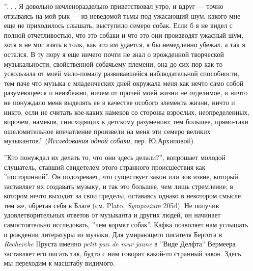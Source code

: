 \documentclass[12pt]{book}
\begin{document}
\smallskip
{}\relax
{}\relax

''. . . Я довольно нечленораздельно приветствовал утро, и вдруг --- точно отзываясь на мой рык --- из неведомой тьмы под ужасающий шум, какого мне еще не приходилось слышать, выступило семеро собак. Если б я не видел с полной отчетливостью, что это собаки и что это они производят ужасный шум, хотя я не мог взять в толк, как это им удается, я бы немедленно убежал, а так я остался. В ту пору я еще ничего почти не знал о врожденной творческой музыкальности, свойственной собачьему племени, она до сих пор как-то ускользала от моей мало-помалу развивавшейся наблюдательной способности, тем паче что музыка с младенческих дней окружала меня как нечто само собой разумеющееся и неизбежно, ничем от прочей моей жизни не отделимое, и ничто не понуждало меня выделять ее в качестве особого элемента жизни, ничто и никто, если не считать кое-каких намеков со стороны взрослых, неопределенных, впрочем, намеков, снисходящих к детскому разумению; тем большее, прямо-таки ошеломительное впечатление произвели на меня эти семеро великих музыкантов.'' (\textit{Исследования одной собаки}, пер. Ю.Архиповой)

\relax
{}\relax
\smallskip

''Кто понуждал их делать то, что они здесь делали?'', вопрошает молодой слушатель, ставший свидетелем этого странного происшествия как ''посторонний''. Он подозревает, что существует закон или зов извне, который заставляет их создавать музыку, и так это большее, чем лишь стремление, в котором нечто выходит за свои пределы, оставаясь однако в некотором смысле тем же, обретая себя в Благе (см. Plato, \textit{Symposium} 205d). Не получив удовлетворительных ответов от музыканта и других людей, он начинает самостоятельно исследовать, ''чем кормят собак''. Кафка позволяет нам услышать о рождении литературы из музыки. Для умирающего писателя Бергота в \textit{Recherche} Пруста именно \textit{petit pan de mur jaune} в ''Виде Делфта'' Вермеера заставляет его писать так, будто с ним говорит какой-то странный закон. Здесь мы переходим к масштабу видимого.
\end{document}
